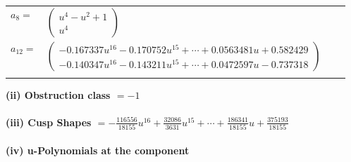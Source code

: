 \documentclass[1p]{elsarticle_modified}
\theoremstyle{definition}
\begin{document}
\begin{tabular}{m{7pt} m{180pt} m{7pt} m{180pt} }
\flushright $a_{8}=$&$\begin{pmatrix}u^4- u^2+1\\u^4\end{pmatrix}$ \\
\flushright $a_{12}=$&$\begin{pmatrix}-0.167337 u^{16}-0.170752 u^{15}+\cdots+0.0563481 u+0.582429\\-0.140347 u^{16}-0.143211 u^{15}+\cdots+0.0472597 u-0.737318\end{pmatrix}$\\&\end{tabular}
\flushleft \textbf{(ii) Obstruction class $= -1$}\\~\\
\flushleft \textbf{(iii) Cusp Shapes $= -\frac{116556}{18155} u^{16}+\frac{32086}{3631} u^{15}+\cdots+\frac{186341}{18155} u+\frac{375193}{18155}$}\\~\\
\newpage\renewcommand{\arraystretch}{1}
\flushleft \textbf{(iv) u-Polynomials at the component}\newline \\
\end{document}
